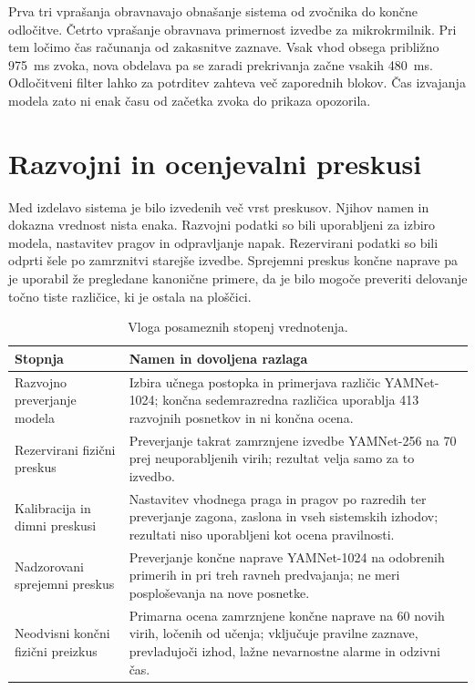 Prva tri vprašanja obravnavajo obnašanje sistema od zvočnika do končne
odločitve. Četrto vprašanje obravnava primernost izvedbe za mikrokrmilnik. Pri
tem ločimo čas računanja od zakasnitve zaznave. Vsak vhod obsega približno
\SI{975}{\milli\second} zvoka, nova obdelava pa se zaradi prekrivanja začne
vsakih \SI{480}{\milli\second}. Odločitveni filter lahko za
potrditev zahteva več zaporednih blokov. Čas izvajanja modela zato ni enak času
od začetka zvoka do prikaza opozorila.

\section{Razvojni in ocenjevalni preskusi}

Med izdelavo sistema je bilo izvedenih več vrst preskusov. Njihov namen in
dokazna vrednost nista enaka. Razvojni podatki so bili uporabljeni za izbiro
modela, nastavitev pragov in odpravljanje napak. Rezervirani podatki so bili
odprti šele po zamrznitvi starejše izvedbe. Sprejemni preskus končne naprave pa
je uporabil že pregledane kanonične primere, da je bilo mogoče preveriti
delovanje točno tiste različice, ki je ostala na ploščici.

\begin{table}[!ht]
  \centering
  \caption{Vloga posameznih stopenj vrednotenja.}
  \label{tab:stopnje-vrednotenja}
  \small
  \begin{tabular}{p{}p{}}
    \toprule
    Stopnja & Namen in dovoljena razlaga \\
    \midrule
    Razvojno preverjanje modela & Izbira učnega postopka in primerjava različic
    YAMNet-1024; končna sedemrazredna različica uporablja 413 razvojnih
    posnetkov in ni končna ocena. \\
    Rezervirani fizični preskus & Preverjanje takrat zamrznjene izvedbe
    YAMNet-256 na 70 prej neuporabljenih virih; rezultat velja samo za to
    izvedbo. \\
    Kalibracija in dimni preskusi & Nastavitev vhodnega praga in pragov po
    razredih ter preverjanje zagona, zaslona in vseh sistemskih izhodov;
    rezultati niso uporabljeni kot ocena pravilnosti. \\
    Nadzorovani sprejemni preskus & Preverjanje končne naprave YAMNet-1024 na
    odobrenih primerih in pri treh ravneh predvajanja; ne meri posploševanja na
    nove posnetke. \\
    Neodvisni končni fizični preizkus & Primarna ocena zamrznjene končne
    naprave na 60 novih virih, ločenih od učenja; vključuje pravilne zaznave,
    prevladujoči izhod, lažne nevarnostne alarme in odzivni čas. \\
    \bottomrule
  \end{tabular}
\end{table}

